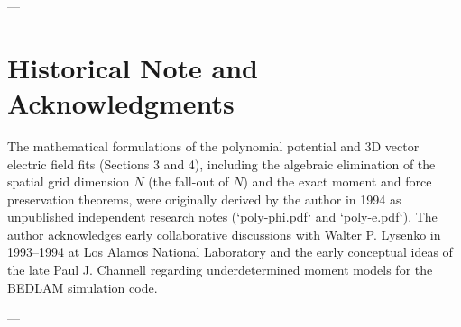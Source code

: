 \documentclass[11pt,a4paper]{article}
\begin{document}
---

\section*{Historical Note and Acknowledgments}
The mathematical formulations of the polynomial potential and 3D vector electric field fits (Sections 3 and 4), including the algebraic elimination of the spatial grid dimension $N$ (the fall-out of $N$) and the exact moment and force preservation theorems, were originally derived by the author in 1994 as unpublished independent research notes (`poly-phi.pdf` and `poly-e.pdf`). The author acknowledges early collaborative discussions with Walter P. Lysenko in 1993--1994 at Los Alamos National Laboratory and the early conceptual ideas of the late Paul J. Channell regarding underdetermined moment models for the BEDLAM simulation code.

---
\end{document}
